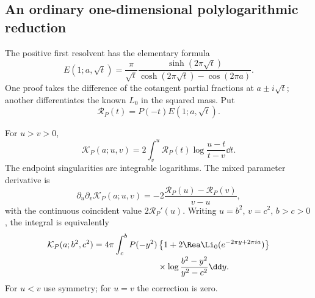 \subsection{An ordinary one-dimensional polylogarithmic reduction}
The positive first resolvent has the elementary formula
\begin{equation}\label{hqj:eq:E1}
E(1;a,\sqrt t)
=\frac\pi{\sqrt t}
\frac{\sinh(2\pi\sqrt t)}{\cosh(2\pi\sqrt t)-\cos(2\pi a)}.
\end{equation}
One proof takes the difference of the cotangent partial fractions at
$a\pm i\sqrt t$; another differentiates the known $L_0$ in the squared
mass. Put
\begin{equation}\label{hqj:eq:RP}
\mathcal R_P(t)=P(-t)E(1;a,\sqrt t).
\end{equation}

\begin{theorem}
\label{hqj:thm:Kintegral}
For $u>v>0$,
\begin{equation}\label{hqj:eq:Kintegral}
\boxed{\mathcal K_P(a;u,v)=2\int_v^u
\mathcal R_P(t)\log\frac{u-t}{t-v}\dd t.}
\end{equation}
The endpoint singularities are integrable logarithms. The mixed
parameter derivative is
\begin{equation}\label{hqj:eq:Kmixed}
\partial_u\partial_v\mathcal K_P(a;u,v)
=-2\frac{\mathcal R_P(u)-\mathcal R_P(v)}{v-u},
\end{equation}
with the continuous coincident value $2\mathcal R_P'(u)$.
Writing $u=b^2$, $v=c^2$, $b>c>0$, the integral is equivalently
\begin{align}
\mathcal K_P(a;b^2,c^2)=4\pi\int_c^b P(-y^2)
&\left\{1+2\Rea\Li_0(e^{-2\pi y+2\pi ia})\right\}
\notag\\[-2pt]
&\times\log\frac{b^2-y^2}{y^2-c^2}\dd y.
\label{hqj:eq:Kpolylog}
\end{align}
For $u<v$ use symmetry; for $u=v$ the correction is zero.
\end{theorem}
